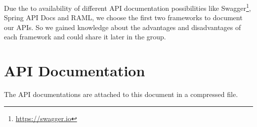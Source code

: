 \documentclass[11pt]{article}
\begin{document}
	Due the to availability of different API documentation possibilities like Swagger\footnote{\url{https://swagger.io}}, Spring API Docs and RAML, we choose the first two frameworks to document our APIs. So we gained knowledge about the advantages and disadvantages of each framework and could share it later in the group.
	
	\section{API Documentation}
	The API documentations are attached to this document in a compressed file.
	
\end{document}
